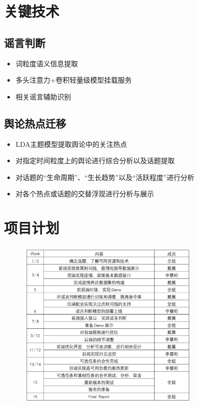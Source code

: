 \documentclass{article}
\begin{document}
\section{关键技术}
\subsection{谣言判断}
\begin{itemize}
	\item{词粒度语义信息提取}
	\item{多头注意力+卷积轻量级模型挂载服务}
	\item{相关谣言辅助识别}
\end{itemize}

\subsection{舆论热点迁移}

\begin{itemize}
	\item{LDA主题模型提取舆论中的关注热点}
	\item{对指定时间粒度上的舆论进行综合分析以及话题提取}
	\item{对话题的“生命周期”、“生长趋势”以及“活跃程度”进行分析}
	\item{对各个热点或话题的交替浮现进行分析与展示}
\end{itemize}


\section{项目计划}
\begin{figure}[H]
\centering
\includegraphics[width=0.8\textwidth]{pic3.png}
\end{figure}
\end{document}
